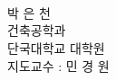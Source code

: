 \begin{center}
 \\
\vspace*{0.3cm}
 \\
\vspace*{0.3cm}
 \\

\end{center}
\begin{flushright}
박 은 천\\
건축공학과\\
단국대학교 대학원\\
\vspace{0.3cm}
지도교수 : 민 경 원
\end{flushright}

\setlength{\baselineskip}{1.5\baselineskip}

